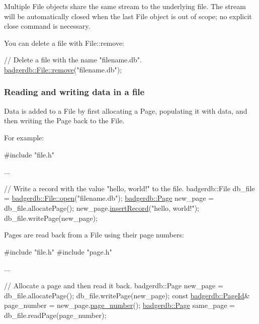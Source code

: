 Multiple File objects share the same stream to the underlying file. The stream will be automatically closed when the last File object is out of scope; no explicit close command is necessary.

You can delete a file with File\-::remove\-: 
\begin{DoxyCode}
\textcolor{comment}{// Delete a file with the name "filename.db".}
\hyperlink{classbadgerdb_1_1File_a1cc69467366badbd68021ac76a91190e}{badgerdb::File::remove}(\textcolor{stringliteral}{"filename.db"});
\end{DoxyCode}
\hypertarget{index_file_data_sec}{}\subsubsection{Reading and writing data in a file}\label{index_file_data_sec}
Data is added to a File by first allocating a Page, populating it with data, and then writing the Page back to the File.

For example\-: 
\begin{DoxyCode}
\textcolor{preprocessor}{#include "file.h"}

...

\textcolor{comment}{// Write a record with the value "hello, world!" to the file.}
badgerdb::File db\_file = \hyperlink{classbadgerdb_1_1File_a8462afdbd250c0a483ddfbde144c8732}{badgerdb::File::open}(\textcolor{stringliteral}{"filename.db"});
\hyperlink{classbadgerdb_1_1Page}{badgerdb::Page} new\_page = db\_file.allocatePage();
new\_page.\hyperlink{classbadgerdb_1_1Page_ad0b1e85fe7849fb767dd8c21a8053cf4}{insertRecord}(\textcolor{stringliteral}{"hello, world!"});
db\_file.writePage(new\_page);
\end{DoxyCode}


Pages are read back from a File using their page numbers\-: 
\begin{DoxyCode}
\textcolor{preprocessor}{#include "file.h"}
\textcolor{preprocessor}{#include "page.h"}

...

\textcolor{comment}{// Allocate a page and then read it back.}
badgerdb::Page new\_page = db\_file.allocatePage();
db\_file.writePage(new\_page);
\textcolor{keyword}{const} \hyperlink{namespacebadgerdb_a1f49e404293bf4240756b89b53b1587a}{badgerdb::PageId}& page\_number = new\_page.\hyperlink{classbadgerdb_1_1Page_af55a0b44876bff4d513bdbed8bc8c5a3}{page\_number}();
\hyperlink{classbadgerdb_1_1Page}{badgerdb::Page} same\_page = db\_file.readPage(page\_number);
\end{DoxyCode}


